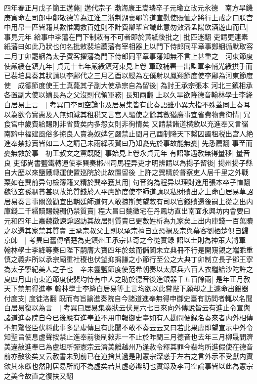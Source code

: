 四年春正月戊子簡王遘薨|{
	遘代宗子}
渤海康王嵩璘卒子元瑜立改元永德　南方旱饑庚寅命左司郎中鄭敬德等為江淮二浙荆湖襄鄂等道宣慰使賑恤之將行上戒之曰朕宫中用帛一匹皆籍其數惟賙救百姓則不計費卿輩宜識此意勿效潘孟陽飲酒遊山而已|{
	事見元年}
給事中李藩在門下制敕有不可者即於黄紙後批之|{
	批匹迷翻}
吏請更連素紙藩曰如此乃狀也何名批敕裴垍薦藩有宰相器上以門下侍郎同平章事鄭絪循默取容二月丁卯罷絪為太子賓客擢藩為門下侍郎同平章事藩知無不言上甚重之　河東節度使嚴綬在鎮九年|{
	貞元十七年嚴綬鎮河東見上卷}
軍政補署一出監軍李輔光綬拱手而已裴垍具奏其狀請以李鄘代之三月乙酉以綬為左僕射以鳳翔節度使李鄘為河東節度使　成德節度使王士真薨其子副大使承宗自為留後|{
	為討王承宗張本}
河北三鎮相承各置副大使以嫡長為之父沒則代領軍務|{
	長知兩翻}
上以久旱欲降德音翰林學士李絳白居易上言　|{
	考異曰李司空論事及居易集皆有此奏語雖小異大指不殊蓋同上奏耳}
以為欲令實惠及人無如減其租税又言宫人驅使之餘其數猶廣事宜省費物貴徇情|{
	冗食宫中歲費給賜則非省費矣内多怨女則非徇情矣}
又請禁諸道横歛以充進奉又言嶺南黔中福建風俗多掠良人賣為奴婢乞嚴禁止閏月己酉制降天下繫囚蠲租税出宫人絶進奉禁掠賣皆如二人之請己未雨絳表賀曰乃知憂先於事故能無憂|{
	先悉薦翻}
事至而憂無救於事　初王叔文之黨既貶|{
	事始見上卷永貞元年}
有詔雖遇赦無得量移|{
	量音良}
吏部尚書鹽鐵轉運使李巽奏郴州司馬程异吏才明辨請以為揚子留後|{
	揚州揚子縣自大歷以來鹽鐵轉運使置廵院於此故置留後}
上許之巽精於督察吏人居千里之外戰栗如在巽前异句檢簿籍又精於巽卒獲其用|{
	句音鉤為程异以理財進用張本卒子恤翻}
魏徵玄孫稠貧甚以故第質錢於人平盧節度使李師道請以私財贖出之上命白居易草詔居易奏言事關激勸宜出朝廷師道何人敢掠斯美望敕有司以官錢贖還後嗣上從之出内庫錢二千緡贖賜魏稠仍禁質賣|{
	程大昌曰魏徵宅在丹鳳坊直出南面永興坊内會要曰元和四年上嘉魏徵諫諍詔訪其故居則質賣已更數姓析為九家矣上出内庫錢一百萬贖之以還其家禁其質賣}
王承宗叔父士則以承宗擅自立恐禍及宗與幕客劉栖楚俱自歸京師　|{
	考異曰舊傳栖楚為吏鎮州王承宗甚奇之今從實録}
詔以士則為神策大將軍　翰林學士李絳等奏曰陛下嗣膺大寶四年於兹而儲闈未立典冊不行是開窺覦之端乖重慎之義非所以承宗廟重社稷也伏望抑撝謙之小節行至公之大典丁卯制立長子鄧王寧為太子寧紀美人之子也　辛未靈鹽節度使范希朝奏以太原兵六百人衣糧給沙陀許之　夏四月山南東道節度使裴均恃有中人之助於德音後進銀器千五百餘兩|{
	是年正月赦天下禁無得進奉}
翰林學士李絳白居易等上言均欲以此嘗陛下願却之上遽命出銀器付度支|{
	度徒洛翻}
既而有旨諭進奏院自今諸道進奉無得申御史臺有訪問者輒以名聞白居易復以為言　|{
	考異曰居易集奏狀云伏見六七日來向外傳說皆云有進止令宣與諸道進奏院自今已後應有進奉並不用申報御史臺如有人勘問便録名奏來者内外相傳不無驚怪臣伏料此事多是虛傳且有此聞不敢不奏云云又曰若此果虚即望宣示中外令知聖旨使息虚聲按禁止進奉前後制敕非一不止於昨閏三月德音也去年三月柳晟閻濟美違赦進奉已為盧坦所彈憲宗云濟美離越州乃逢赦令釋其罪今裴均所進假使在德音前亦赦後矣又云赦書未到前已在道捨其過是則憲宗深惑于左右之言外示不受獻内實欲其來獻也然則居易所聞不為虚矣若其虛必辯明也實錄及李司空論事皆以此為憲宗之美今故直之復扶又翻}

